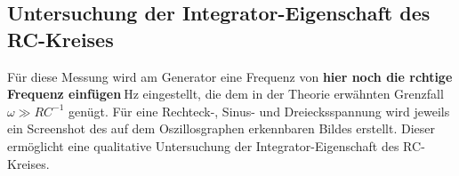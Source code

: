 \subsection{Untersuchung der Integrator-Eigenschaft des RC-Kreises}
Für diese Messung wird am Generator eine Frequenz von \textbf{hier noch die rchtige Frequenz einfügen}$\SI{}{\hertz}$ eingestellt, die dem in der Theorie erwähnten Grenzfall $\omega \gg RC^{-1}$ genügt. %
Für eine Rechteck-, Sinus- und Dreiecksspannung wird
jeweils ein Screenshot des auf dem Oszillosgraphen erkennbaren Bildes erstellt. Dieser ermöglicht eine qualitative Untersuchung der %
Integrator-Eigenschaft des RC-Kreises. %
